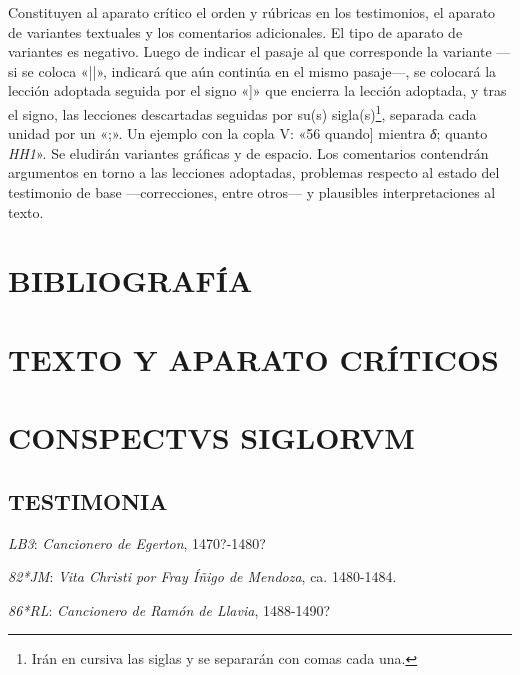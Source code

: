 \documentclass[11pt,a4paper,twoside]{article}
\newcommand{\comillas}[1]{«#1»}
\begin{document}
Constituyen al aparato crítico el orden y rúbricas en los testimonios, el aparato de variantes textuales y los comentarios adicionales. El tipo de aparato de variantes es negativo. Luego de indicar el pasaje al que corresponde la variante —si se coloca \comillas{||}, indicará que aún continúa en el mismo pasaje—, se colocará la lección adoptada seguida por el signo \comillas{]} que encierra la lección adoptada, y tras el signo, las lecciones descartadas seguidas por su(s) sigla(s)\footnote{Irán en cursiva las siglas y se separarán con comas cada una.}, separada cada unidad por un \comillas{;}. Un ejemplo con la copla V: \comillas{56 quando] mientra \textit{δ}; quanto \textit{HH1}}. Se eludirán variantes gráficas y de espacio. Los comentarios contendrán argumentos en torno a las lecciones adoptadas, problemas respecto al estado del testimonio de base —correcciones, entre otros— y plausibles interpretaciones al texto.

\section*{{\fontsize{13}{14.35}\selectfont BIBLIOGRAFÍA}}
\nocite{*}
\printbibliography[heading=none]
\newpage

\section*{\raggedleft \fontsize{13}{14.35}\selectfont TEXTO Y APARATO CRÍTICOS}
\newpage

\section*{{\fontsize{13}{14.35}\selectfont CONSPECTVS SIGLORVM}}

\subsection*{{\fontsize{11}{11.96}\selectfont TESTIMONIA}}

\textit{LB3}: \textit{Cancionero de Egerton}, 1470?-1480?

\textit{82*JM}: \textit{Vita Christi por Fray Íñigo de Mendoza}, ca. 1480-1484.

\textit{86*RL}: \textit{Cancionero de Ramón de Llavia}, 1488-1490?
\end{document}
